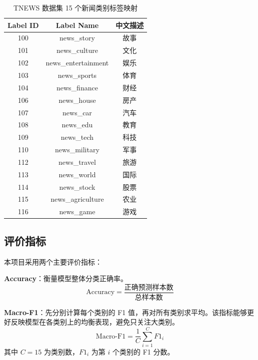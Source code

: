 \documentclass[a4paper]{article}
\begin{document}
\begin{table}[H]
    \centering
    \small
    \begin{tabular}{|c|c|c|}
        \hline
        \textbf{Label ID} & \textbf{Label Name} & \textbf{中文描述} \\
        \hline
        100 & news\_story & 故事 \\
        101 & news\_culture & 文化 \\
        102 & news\_entertainment & 娱乐 \\
        103 & news\_sports & 体育 \\
        104 & news\_finance & 财经 \\
        106 & news\_house & 房产 \\
        107 & news\_car & 汽车 \\
        108 & news\_edu & 教育 \\
        109 & news\_tech & 科技 \\
        110 & news\_military & 军事 \\
        112 & news\_travel & 旅游 \\
        113 & news\_world & 国际 \\
        114 & news\_stock & 股票 \\
        115 & news\_agriculture & 农业 \\
        116 & news\_game & 游戏 \\
        \hline
    \end{tabular}
    \caption{TNEWS 数据集 15 个新闻类别标签映射}
    \label{tab:labels}
\end{table}

\subsection{评价指标}

本项目采用两个主要评价指标：

\textbf{Accuracy}：衡量模型整体分类正确率。
\begin{equation}
\text{Accuracy} = \frac{\text{正确预测样本数}}{\text{总样本数}}
\end{equation}

\textbf{Macro-F1}：先分别计算每个类别的 F1 值，再对所有类别求平均。该指标能够更好反映模型在各类别上的均衡表现，避免只关注大类别。
\begin{equation}
\text{Macro-F1} = \frac{1}{C}\sum_{i=1}^{C} F1_i
\end{equation}
其中 $C=15$ 为类别数，$F1_i$ 为第 $i$ 个类别的 F1 分数。
\end{document}
